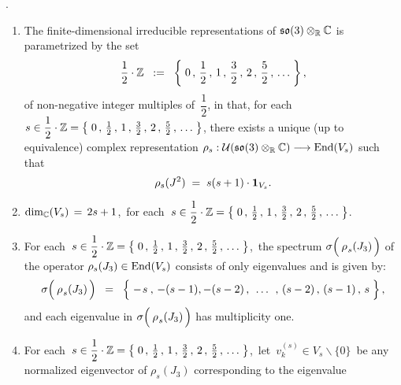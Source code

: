 
\begin{theorem}
{\color{white}.}\vskip -0.1cm
\noindent
\begin{enumerate}
\item
	The finite-dimensional irreducible representations of $\mathfrak{so}(3) \otimes_{\mathbb{R}} \mathbb{C}$ is parametrized by the set
	\begin{equation*}
	\dfrac{1}{2} \cdot \mathbb{Z}
	\;\; := \;\;
		\left\{\;0 \,,\, \dfrac{1}{2} \,,\, 1 \,,\, \frac{3}{2} \,,\, 2 \,,\, \frac{5}{2} \,,\, \ldots \;\right\},
	\end{equation*}
	of non-negative integer multiples of \,$\dfrac{1}{2}$, in that, for each
	$s \in \dfrac{1}{2} \cdot \mathbb{Z} = \left\{\; 0 \,,\, \frac{1}{2}\,,\, 1\,,\, \frac{3}{2}\,,\, 2\,,\, \frac{5}{2}\,,\, \ldots \;\right\}$,
	there exists a unique (up to equivalence) complex representation
	$\rho_{s} : \mathcal{U}(\mathfrak{so}(3)\otimes_{\mathbb{R}}\mathbb{C}) \longrightarrow \textnormal{End}(V_{s})$
	such that
	\begin{equation*}
	\rho_{s}(J^{2}) \; = \; s(s+1)\cdot\textnormal{\textbf{1}}_{V_{s}}.
	\end{equation*}
\item
	$\dim_{\mathbb{C}}(V_{s}) \, = \, 2s + 1$,\, for each
	\,$s \in \dfrac{1}{2} \cdot \mathbb{Z} = \left\{\; 0 \,,\, \frac{1}{2}\,,\, 1\,,\, \frac{3}{2}\,,\, 2\,,\, \frac{5}{2}\,,\, \ldots \;\right\}$.
\item
	For each
	\,$s \in \dfrac{1}{2} \cdot \mathbb{Z} = \left\{\; 0 \,,\, \frac{1}{2}\,,\, 1\,,\, \frac{3}{2}\,,\, 2\,,\, \frac{5}{2}\,,\, \ldots \;\right\}$,\,
	the spectrum
	$\sigma\!\left(\,\overset{{\color{white}-}}{\rho}_{s}(J_{3})\,\right)$
	of the operator $\rho_{s}(J_{3}) \in \textnormal{End}(V_{s})$
	consists of only eigenvalues and is given by:
	\begin{equation*}
	\sigma\!\left(\,\overset{{\color{white}-}}{\rho}_{s}(J_{3})\,\right)
	\;\; = \;\;
		\left\{\;
			-\overset{{\color{white}-}}{s} \,,\, -(s-1), -(s-2)
			\,,\;\, \ldots \,\;,\,
			(s-2) \,,\, (s-1) \,,\, s
			\;\right\},
	\end{equation*}
	and each eigenvalue in 
	$\sigma\!\left(\,\overset{{\color{white}-}}{\rho}_{s}(J_{3})\,\right)$
	has multiplicity one.
\item
	For each
	\,$s \in \dfrac{1}{2} \cdot \mathbb{Z} = \left\{\; 0 \,,\, \frac{1}{2}\,,\, 1\,,\, \frac{3}{2}\,,\, 2\,,\, \frac{5}{2}\,,\, \ldots \;\right\}$,\,
	let \,$v^{(s)}_{k} \in V_{s}\backslash\{0\}$\, be any normalized eigenvector
	of $\rho_{s}(J_{3})$ corresponding to the eigenvalue

\end{enumerate}
\end{theorem}
